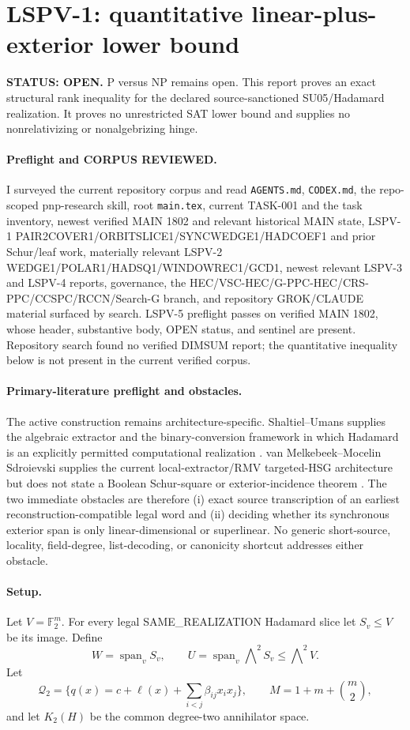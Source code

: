 \documentclass[11pt]{article}
\begin{document}
\section*{LSPV-1: quantitative linear-plus-exterior lower bound}
\textbf{STATUS: OPEN.} P versus NP remains open. This report proves an exact structural rank inequality for the declared source-sanctioned SU05/Hadamard realization. It proves no unrestricted SAT lower bound and supplies no nonrelativizing or nonalgebrizing hinge.

\paragraph{Preflight and CORPUS REVIEWED.}
I surveyed the current repository corpus and read \texttt{AGENTS.md}, \texttt{CODEX.md}, the repo-scoped pnp-research skill, root \texttt{main.tex}, current TASK-001 and the task inventory, newest verified MAIN 1802 and relevant historical MAIN state, LSPV-1 PAIR2COVER1/ORBITSLICE1/SYNCWEDGE1/HADCOEF1 and prior Schur/leaf work, materially relevant LSPV-2 WEDGE1/POLAR1/HADSQ1/WINDOWREC1/GCD1, newest relevant LSPV-3 and LSPV-4 reports, governance, the HEC/VSC-HEC/G-PPC-HEC/CRS-PPC/CCSPC/RCCN/Search-G branch, and repository GROK/CLAUDE material surfaced by search. LSPV-5 preflight passes on verified MAIN 1802, whose header, substantive body, OPEN status, and sentinel are present. Repository search found no verified DIMSUM report; the quantitative inequality below is not present in the current verified corpus.

\paragraph{Primary-literature preflight and obstacles.}
The active construction remains architecture-specific. Shaltiel--Umans supplies the algebraic extractor and the binary-conversion framework in which Hadamard is an explicitly permitted computational realization \cite{SU05}. van Melkebeek--Mocelin Sdroievski supplies the current local-extractor/RMV targeted-HSG architecture but does not state a Boolean Schur-square or exterior-incidence theorem \cite{vMS25}. The two immediate obstacles are therefore (i) exact source transcription of an earliest reconstruction-compatible legal word and (ii) deciding whether its synchronous exterior span is only linear-dimensional or superlinear. No generic short-source, locality, field-degree, list-decoding, or canonicity shortcut addresses either obstacle.

\paragraph{Setup.}
Let \(V=\mathbb F_2^m\). For every legal SAME\_REALIZATION Hadamard slice let \(S_v\le V\) be its image. Define
\[
W=\operatorname{span}_v S_v,\qquad U=\operatorname{span}_v\bigwedge\nolimits^2 S_v\le \bigwedge\nolimits^2V.
\]
Let
\[
\mathcal Q_2=\{q(x)=c+\ell(x)+\sum_{i<j}\beta_{ij}x_ix_j\},\qquad M=1+m+\binom m2,
\]
and let \(K_2(H)\) be the common degree-two annihilator space.
\end{document}
